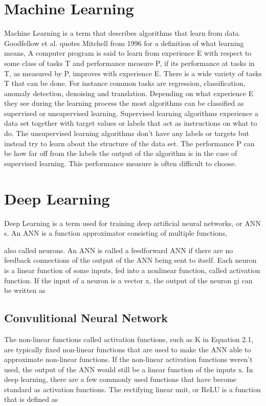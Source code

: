 \section{Machine Learning}
Machine Learning is a term that describes algorithms that learn from data.
Goodfellow et al. quotes Mitchell from 1996 for a definition of
what learning means, A computer program is said to learn from experience
E with respect to some class of tasks T and performance measure P, if its
performance at tasks in T, as measured by P, improves with experience E.
There is a wide variety of tasks T that can be done. For instance common
tasks are regression, classification, anomaly detection, denoising and translation.
Depending on what experience E they see during the learning process the most
algorithms can be classified as supervised or unsupervised learning. Supervised
learning algorithms experience a data set together with target values or labels
that act as instructions on what to do. The unsupervised learning algorithms
don’t have any labels or targets but instead try to learn about the structure of
the data set. The performance P can be how far off from the labels the output
of the algorithm is in the case of supervised learning. This performance measure
is often difficult to choose.



\section{Deep Learning}
Deep Learning is a term used for training deep artificial neural networks, or
ANN s. An ANN is a function approximator consisting of multiple functions,

also called neurons. An ANN is called a feedforward ANN if there are no
feedback connections of the output of the ANN being sent to itself. Each neuron
is a linear function of some inputs, fed into a nonlinear function, called activation
function. If the input of a neuron is a vector x, the output of the neuron gi can
be written as


\subsection{Convulitional Neural Network}
The non-linear functions called activation functions, such as K in Equation 2.1,
are typically fixed non-linear functions that are used to make the ANN able to
approximate non-linear functions. If the non-linear activation functions weren’t
used, the output of the ANN would still be a linear function of the inputs x. In deep learning, there are a few commonly used functions that
have become standard as activation functions.
The rectifying linear unit, or ReLU is a function that is defined as



